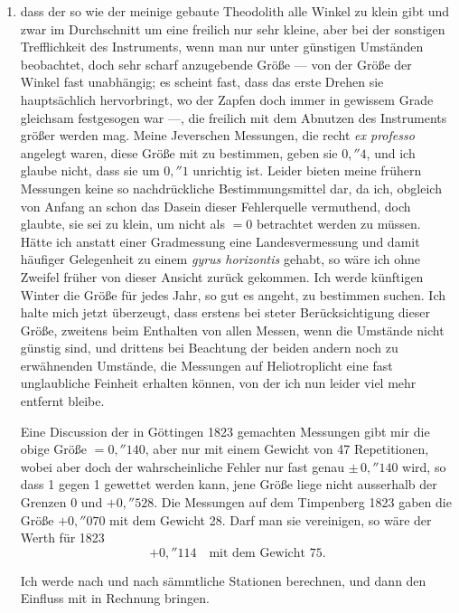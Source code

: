 \documentclass[12pt,a4paper]{article}
\theoremstyle{plain}
\theoremstyle{definition}
\theoremstyle{remark}
\begin{document}
\begin{enumerate}[label=\arabic*)]
\item \label{item:fehler1}dass der so wie der meinige gebaute Theodolith alle Winkel zu klein gibt und zwar im Durchschnitt um eine freilich nur sehr kleine, aber bei der sonstigen Trefflichkeit des Instruments, wenn man nur unter g\"unstigen Umst\"anden beobachtet, doch sehr scharf anzugebende Gr\"o\ss e --- von der Gr\"o\ss e der Winkel fast unabh\"angig; es scheint fast, dass das erste Drehen sie haupts\"achlich hervorbringt, wo der Zapfen doch immer in gewissem Grade gleichsam festgesogen war ---, die freilich mit dem Abnutzen des Instruments gr\"o\ss er werden mag. Meine Jeverschen Messungen, die recht \textit{ex professo} angelegt waren, diese Gr\"o\ss e mit zu bestimmen, geben sie $0{,}\!''\!4$, und ich glaube nicht, dass sie um $0{,}\!''\!1$ unrichtig ist. Leider bieten meine fr\"uhern Messungen keine so nachdr\"uckliche Bestimmungsmittel dar, da ich, obgleich von Anfang an schon das Dasein dieser Fehlerquelle vermuthend, doch glaubte, sie sei zu klein, um nicht als $= 0$ betrachtet werden zu m\"ussen. H\"atte ich anstatt einer Gradmessung eine Landesvermessung und damit h\"aufiger Gelegenheit zu einem \textit{gyrus horizontis} gehabt, so w\"are ich ohne Zweifel fr\"uher von dieser Ansicht zur\"uck gekommen. Ich werde k\"unftigen Winter die Gr\"o\ss e f\"ur jedes Jahr, so gut es angeht, zu bestimmen suchen. Ich halte mich jetzt \"uberzeugt, dass erstens bei steter Ber\"ucksichtigung dieser Gr\"o\ss e, zweitens beim Enthalten von allen Messen, wenn die Umst\"ande nicht g\"unstig sind, und drittens bei Beachtung der beiden andern noch zu erw\"ahnenden Umst\"ande, die Messungen auf Heliotroplicht eine fast unglaubliche Feinheit erhalten k\"onnen, von der ich nun leider viel mehr entfernt bleibe.

Eine Discussion der in G\"ottingen 1823 gemachten Messungen gibt mir die obige Gr\"o\ss e $= 0{,}\!''\!140$, aber nur mit einem Gewicht von 47 Repetitionen, wobei aber doch der wahrscheinliche Fehler nur fast genau $\pm\,0{,}\!''\!140$ wird, so dass 1 gegen 1 gewettet werden kann, jene Gr\"o\ss e liege nicht ausserhalb der Grenzen $0$ und $+0{,}\!''\!528$. Die Messungen auf dem Timpenberg 1823 gaben die Gr\"o\ss e $+0{,}\!''\!070$ mit dem Gewicht 28. Darf man sie vereinigen, so w\"are der Werth f\"ur 1823
\[
+0{,}\!''\!114 \quad \text{mit dem Gewicht } 75.
\]

Ich werde nach und nach s\"ammtliche Stationen berechnen, und dann den Einfluss mit in Rechnung bringen.


\end{enumerate}
\end{document}

